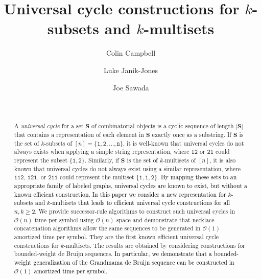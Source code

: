 \documentclass[US-letter,USenglish,authorcolumns,autoref]{lipics-v2021}
\title{Universal cycle constructions for $k$-subsets and $k$-multisets}
\author{Colin Campbell}{University of Guelph, Canada}{}{}{}
\author{Luke Janik-Jones}{University of Guelph, Canada}{}{}{}
\author{Joe Sawada}{University of Guelph, Canada}{}{}{}
\author{~}{~}{}{}{}
\renewcommand{\tt} {\mathtt}
\newcommand{\bS}{\mathbf{S}}
\newcommand{\edit}[1]{\textcolor{black}{#1}}
\begin{document}

\maketitle

\frenchspacing

\begin{abstract} 
A \emph{universal cycle} for a set $\bS$ of combinatorial objects is a cyclic sequence of length $|\bS|$ that contains a representation of each element in $\bS$ exactly once as a substring. 
If $\bS$ is the set of $k$-subsets of $[n] = \{\tt{1,2},\ldots, \tt{n}\}$, it is well-known that universal cycles do not always exists when applying a simple string representation, where $\tt{12}$ or $\tt{21}$ could represent the subset $\{\tt{1,2}\}$.  Similarly, if $\bS$ is the set of  $k$-multisets of $[n]$, it is also known that universal cycles do not always exist using a similar representation,  where $\tt{112}$, $\tt{121}$, or $\tt{211}$ could represent the multiset $\{\tt{1,1,2}\}$.  \edit{By mapping these sets to an appropriate family of labeled graphs, universal cycles are known to exist, but without a known efficient construction.  In this paper we consider a new representation for $k$-subsets and $k$-multisets that leads to efficient universal cycle constructions for all $n,k \geq 2$.}
We provide successor-rule algorithms to construct such universal cycles in $\mathcal{O}(n)$ time per symbol using $\mathcal{O}(n)$ space and demonstrate that necklace concatenation algorithms allow the same sequences to be generated in $\mathcal{O}(1)$ amortized time per symbol.   They are the first known efficient universal cycle constructions for $k$-multisets. 
The results are obtained by considering constructions for bounded-weight de Bruijn sequences. \edit{In particular, we demonstrate that a bounded-weight generalization of the Grandmama de Bruijn sequence can be constructed in $\mathcal{O}(1)$ amortized time per symbol.}
\end{abstract}
\end{document}

